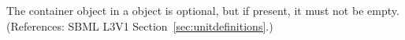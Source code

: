 The \ListOfUnits container object in a \UnitDefinition object
is optional, but if present, it must not be empty.  (References: SBML L3V1
Section~\ref{sec:unitdefinitions}.)
